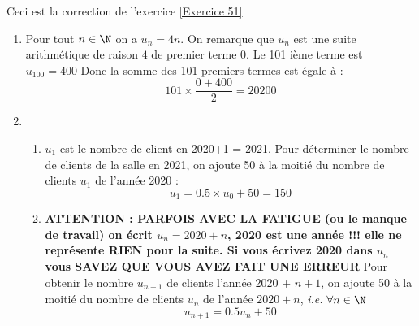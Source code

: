\documentclass[12pt,fleqn]{report} %
\begin{document}
\begin{correction}
	Ceci est la correction de l'exercice \ref{Exercice 51}
	\begin{enumerate}
		\item Pour tout $n\in \N$ on a $u_n = 4n$. On remarque que $u_n$ est une suite arithmétique de raison $4$ de premier terme $0$. Le 101 ième terme est $u_{100} = 400$ Donc la somme des 101 premiers termes est égale à : \[
		101 \times \frac{0 + 400}{2} = 20200
		\] 
		\item \begin{enumerate}
			\item $u_1$ est le nombre de client en 2020+1 = 2021. Pour déterminer le nombre de clients de la salle en 2021, on ajoute 50 à la moitié du nombre de clients $u_1$ de l'année 2020 : \[
			u_1 = 0.5 \times u_0 + 50 = 150
			\]
			\item \textbf{ATTENTION : PARFOIS AVEC LA FATIGUE (ou le manque de travail) on écrit $u_n = 2020+n$, 2020 est une année !!! elle ne représente RIEN pour la suite. Si vous écrivez 2020 dans $u_n$ vous SAVEZ QUE VOUS AVEZ FAIT UNE ERREUR} Pour obtenir le nombre $u_{n+1}$ de clients l'année 2020 + $n  + 1$, on ajoute 50 à la moitié du nombre de clients $u_n$ de l'année $2020 + n$, \emph{i.e.} $\forall n \in \N$ \[
			u_{n+1} = 0.5 u_n + 50
			\]
		\end{enumerate}
	\end{enumerate}
\end{correction}
\pagebreak
\end{document}
